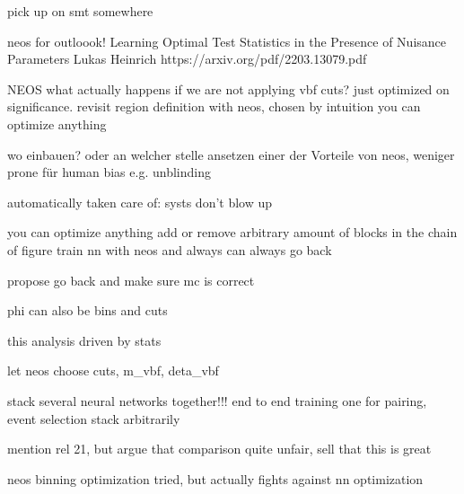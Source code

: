 
pick up on smt somewhere


neos
for outloook!
Learning Optimal Test Statistics in the Presence of
Nuisance Parameters
Lukas Heinrich
https://arxiv.org/pdf/2203.13079.pdf 

NEOS
what actually happens if we are not applying vbf cuts? just optimized on significance.
revisit region definition with neos, chosen by intuition 
you can optimize anything 

wo einbauen? oder an welcher stelle ansetzen
einer der Vorteile von neos, weniger prone für human bias e.g. unblinding

automatically taken care of: systs don't blow up

you can optimize anything
add or remove arbitrary amount of blocks in the chain of figure 
train nn with neos and always can always go back

propose go back and make sure mc is correct

phi can also be bins and cuts

this analysis driven by stats

let neos choose cuts,
m_vbf, deta_vbf


stack several neural networks together!!! end to end training 
one for pairing, event selection 
stack arbitrarily 




mention rel 21, but argue that comparison quite unfair, sell that this is great


neos
binning optimization tried, but actually fights against nn optimization

